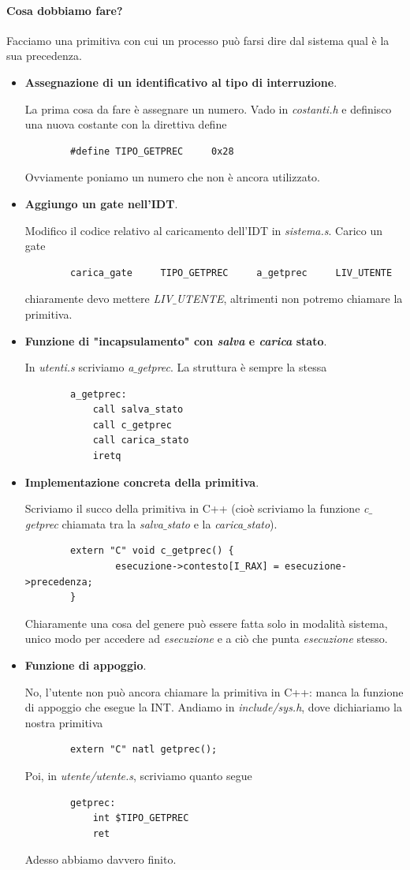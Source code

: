 \documentclass[11pt]{report}
\theoremstyle{definition}
\begin{document}
\paragraph{Cosa dobbiamo fare?} Facciamo una primitiva con cui un processo può farsi dire dal sistema qual è la sua precedenza.
\begin{itemize}
	\item \textbf{Assegnazione di un identificativo al tipo di interruzione}. 
	
	La prima cosa da fare è assegnare un numero. Vado in \emph{costanti.h} e definisco una nuova costante con la direttiva define
	\begin{verbatim}
		#define TIPO_GETPREC     0x28
	\end{verbatim}
	Ovviamente poniamo un numero che non è ancora utilizzato.
	
	\item \textbf{Aggiungo un gate nell'IDT}.
	
	Modifico il codice relativo al caricamento dell'IDT in \emph{sistema.s}. Carico un gate 
	\begin{verbatim}
		carica_gate     TIPO_GETPREC     a_getprec     LIV_UTENTE
	\end{verbatim}
	chiaramente devo mettere \emph{LIV$\_$UTENTE}, altrimenti non potremo chiamare la primitiva.
	
	\item \textbf{Funzione di "incapsulamento" con \emph{salva} e \emph{carica} stato}. 
	
	In \emph{utenti.s} scriviamo \emph{a$\_$getprec}. La struttura è sempre la stessa
	\begin{verbatim}
		a_getprec:
		    call salva_stato
		    call c_getprec
		    call carica_stato
		    iretq
	\end{verbatim}
	
	\item \textbf{Implementazione concreta della primitiva}. 
	
	Scriviamo il succo della primitiva in C++ (cioè scriviamo la funzione \emph{c$\_$getprec} chiamata tra la \emph{salva$\_$stato} e la \emph{carica$\_$stato}).
	\begin{verbatim}
		extern "C" void c_getprec() {
			    esecuzione->contesto[I_RAX] = esecuzione->precedenza;
		}
	\end{verbatim}
	Chiaramente una cosa del genere può essere fatta solo in modalità sistema, unico modo per accedere ad \emph{esecuzione} e a ciò che punta \emph{esecuzione} stesso.
	\item \textbf{Funzione di appoggio}. 
	
	No, l'utente non può ancora chiamare la primitiva in C++: manca la funzione di appoggio che esegue la INT. Andiamo in \emph{include/sys.h}, dove dichiariamo la nostra primitiva
	\begin{verbatim}
		extern "C" natl getprec();
	\end{verbatim}
	Poi, in \emph{utente/utente.s}, scriviamo quanto segue
	\begin{verbatim}
		getprec:    
		    int $TIPO_GETPREC
		    ret
	\end{verbatim}
	Adesso abbiamo davvero finito.
\end{itemize}
\end{document}
